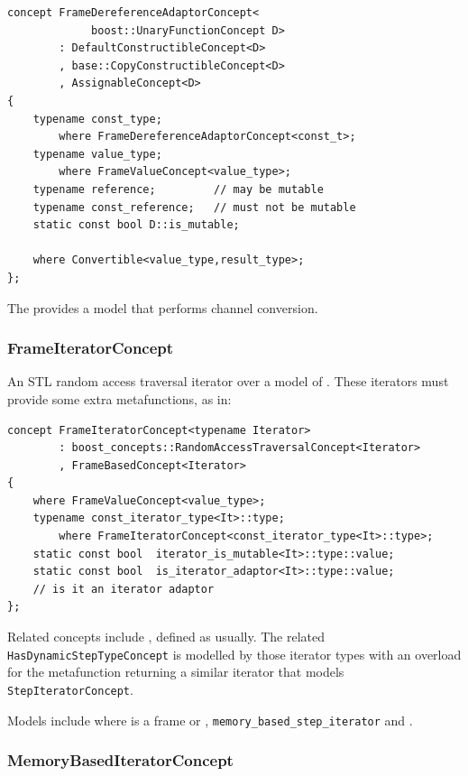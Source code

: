 \begin{lstlisting}
concept FrameDereferenceAdaptorConcept<
             boost::UnaryFunctionConcept D>
        : DefaultConstructibleConcept<D>
        , base::CopyConstructibleConcept<D>
        , AssignableConcept<D>  
{
    typename const_type;
        where FrameDereferenceAdaptorConcept<const_t>;
    typename value_type;
        where FrameValueConcept<value_type>;
    typename reference;         // may be mutable
    typename const_reference;   // must not be mutable
    static const bool D::is_mutable;

    where Convertible<value_type,result_type>;
};
\end{lstlisting}

The  provides a model that performs
channel conversion.

\subsubsection{{FrameIteratorConcept}}

An STL random access traversal iterator over a model of
. These iterators must provide some extra
metafunctions, as in:

\begin{lstlisting}
concept FrameIteratorConcept<typename Iterator> 
        : boost_concepts::RandomAccessTraversalConcept<Iterator>
        , FrameBasedConcept<Iterator> 
{
    where FrameValueConcept<value_type>;
    typename const_iterator_type<It>::type;         
        where FrameIteratorConcept<const_iterator_type<It>::type>;
    static const bool  iterator_is_mutable<It>::type::value;          
    static const bool  is_iterator_adaptor<It>::type::value;
    // is it an iterator adaptor
};
\end{lstlisting}

Related concepts include ,
defined as usually. The related \texttt{Has\-Dynamic\-StepTypeConcept}
is modelled by those iterator types with an overload for the
 metafunction returning a similar
iterator that models \texttt{Step\-Iterator\-Concept}.

Models include  where  is a frame or
,
\texttt{memory\-\_based\-\_step\-\_iterator} and
.

\subsubsection{{MemoryBasedIteratorConcept}}

